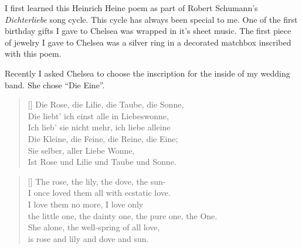 \documentclass{article}
\begin{document}
\begin{multicols}{2}
    \columnbreak
    
    

     I first learned this
    Heinrich Heine poem as part of Robert Schumann's {\it Dichterliebe} song
    cycle. This cycle has always been special to me. One of the first birthday
    gifts I gave to Chelsea was wrapped in it's sheet music. The first piece of
    jewelry I gave to Chelsea was a silver ring in a decorated matchbox
    inscribed with this poem.

    Recently I asked Chelsea to choose the inscription for the inside of my
    wedding band. She chose ``Die Eine''.

    \settowidth{\versewidth}{the little one, the dainty one, the pure one, the One.}
    \begin{verse}[\versewidth]
    Die Rose, die Lilie, die Taube, die Sonne,\\
    Die liebt' ich einst alle in Liebeswonne,\\
    Ich lieb' sie nicht mehr, ich liebe alleine\\
    Die Kleine, die Feine, die Reine, die Eine;\\
    Sie selber, aller Liebe Wonne,\\
    Ist Rose und Lilie und Taube und Sonne.\\
    \end{verse}
    \settowidth{\versewidth}{the little one, the dainty one, the pure one, the One.}
    \begin{verse}[\versewidth]
    The rose, the lily, the dove, the sun-\\
    I once loved them all with ecstatic love.\\
    I love them no more, I love only\\
    the little one, the dainty one, the pure one, the One.\\
    She alone, the well-spring of all love,\\
    is rose and lily and dove and sun.\\
    \end{verse}

    \columnbreak
    \pagebreak
    
    \closearticle
    
    \columnbreak
    \begin{multicols}{2}
        
    \end{multicols}
\end{multicols}
\pagebreak



\end{document}
